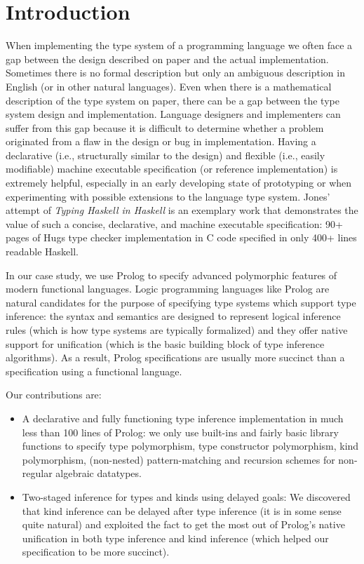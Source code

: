 \section{Introduction}\label{sec:intro}
When implementing the type system of a programming language we often face a gap between
the design described on paper and the actual implementation. Sometimes
there is no formal description but only an ambiguous description in English
(or in other natural languages). Even when there is a mathematical description
of the type system on paper, there can be a gap between the type system design
and implementation. Language designers and implementers can suffer from this gap
because it is difficult to determine whether a problem originated from a flaw
in the design or bug in implementation.
Having a declarative (i.e., structurally similar to the design)
and flexible (i.e., easily modifiable) machine executable specification
(or reference implementation) is extremely helpful, especially
in an early developing state of prototyping or when experimenting with
possible extensions to the language type system.  
Jones' attempt of \emph{Typing Haskell in Haskell} \cite{JonesTHiH99} is
an exemplary work that demonstrates the value of such a concise, declarative,
and machine executable specification:
90+ pages of Hugs type checker implementation in C code specified in
only 400+ lines readable Haskell.

In our case study, we use Prolog to specify advanced polymorphic features of
modern functional languages. Logic programming languages like Prolog
are natural candidates for the purpose of specifying type systems
which support type inference: the syntax and semantics are
designed to represent logical inference rules (which is how type systems
are typically formalized) and they offer native support for unification (which
is the basic building block of type inference algorithms). As a result,
Prolog specifications are usually more succinct than a specification
using a functional language.

Our contributions are:
\begin{itemize}\vspace*{-1.75ex}
\item A declarative and fully functioning type inference implementation
in much less than 100 lines of Prolog: we only use built-ins and
fairly basic library functions to specify
type polymorphism, type constructor polymorphism, kind polymorphism,
(non-nested) pattern-matching and recursion schemes for non-regular
algebraic datatypes.
\item Two-staged inference for types and kinds using delayed goals:
We discovered that kind inference can be delayed after type inference
(it is in some sense quite natural) and exploited the fact to get the
most out of Prolog's native unification in both type inference and
kind inference (which helped our specification to be more succinct).
\end{itemize}

